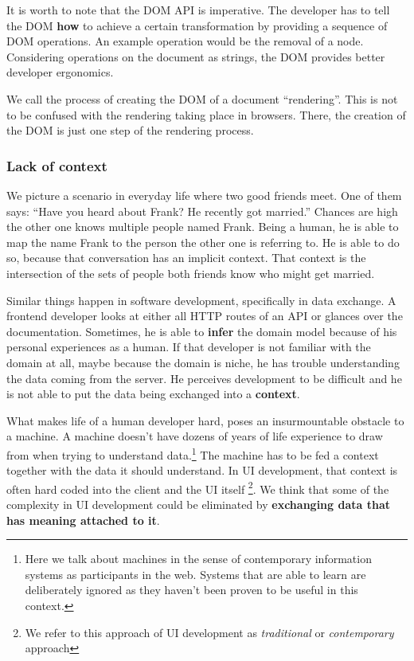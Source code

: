 It is worth to note that the DOM API is imperative. The developer has to tell the DOM \textbf{how} to achieve a certain transformation by providing a sequence of DOM operations. An example operation would be the removal of a node. Considering operations on the document as strings, the DOM provides better developer ergonomics.

We call the process of creating the DOM of a document ``rendering''. This is not to be confused with the rendering taking place in browsers. There, the creation of the DOM is just one step of the rendering process.

\subsubsection{Lack of context}\label{datahumanmachine}
We picture a scenario in everyday life where two good friends meet. One of them says: ``Have you heard about Frank? He recently got married.'' Chances are high the other one knows multiple people named Frank. Being a human, he is able to map the name Frank to the person the other one is referring to. He is able to do so, because that conversation has an implicit context. That context is the intersection of the sets of people both friends know who might get married.

Similar things happen in software development, specifically in data exchange. A \gls{frontend} developer looks at either all HTTP routes of an API or glances over the documentation. Sometimes, he is able to \textbf{infer} the domain model because of his personal experiences as a human. If that developer is not familiar with the domain at all, maybe because the domain is niche, he has trouble understanding the data coming from the server. He perceives development to be difficult and he is not able to put the data being exchanged into a \textbf{context}.

What makes life of a human developer hard, poses an insurmountable obstacle to a machine. A machine doesn't have dozens of years of life experience to draw from when trying to understand data.\footnote{Here we talk about machines in the sense of contemporary information systems as participants in the web. Systems that are able to learn are deliberately ignored as they haven't been proven to be useful in this context.} The machine has to be fed a context together with the data it should understand. In UI development, that context is often hard coded into the client and the UI itself \footnote{We refer to this approach of UI development as \textit{traditional} or \textit{contemporary} approach}. We think that some of the complexity in UI development could be eliminated by \textbf{exchanging data that has meaning attached to it}.

